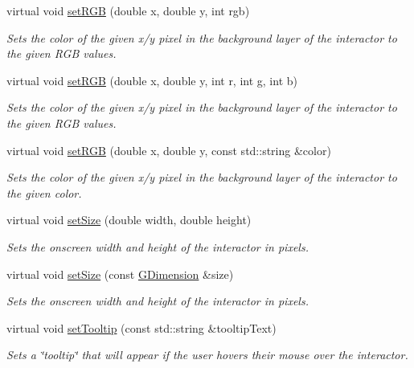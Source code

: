 \begin{DoxyCompactItemize}
virtual void \mbox{\hyperlink{classGDrawingSurface_a8bcbd65fa784bdab1e66a9efd381162d}{set\+R\+GB}} (double x, double y, int rgb)
\begin{DoxyCompactList}\small\item\em Sets the color of the given x/y pixel in the background layer of the interactor to the given R\+GB values. \end{DoxyCompactList}\item 
virtual void \mbox{\hyperlink{classGDrawingSurface_a81202471d4fc9f2015aef0bc073acfab}{set\+R\+GB}} (double x, double y, int r, int g, int b)
\begin{DoxyCompactList}\small\item\em Sets the color of the given x/y pixel in the background layer of the interactor to the given R\+GB values. \end{DoxyCompactList}\item 
virtual void \mbox{\hyperlink{classGDrawingSurface_ae9a228792d4bb4b628350f39eaa3ad12}{set\+R\+GB}} (double x, double y, const std\+::string \&color)
\begin{DoxyCompactList}\small\item\em Sets the color of the given x/y pixel in the background layer of the interactor to the given color. \end{DoxyCompactList}\item 
virtual void \mbox{\hyperlink{classGInteractor_aca25d49481f9bf5fc8f7df4c086c4ce7}{set\+Size}} (double width, double height)
\begin{DoxyCompactList}\small\item\em Sets the onscreen width and height of the interactor in pixels. \end{DoxyCompactList}\item 
virtual void \mbox{\hyperlink{classGInteractor_ae2b628228f192c2702c4ce941b2af68f}{set\+Size}} (const \mbox{\hyperlink{classGDimension}{G\+Dimension}} \&size)
\begin{DoxyCompactList}\small\item\em Sets the onscreen width and height of the interactor in pixels. \end{DoxyCompactList}\item 
virtual void \mbox{\hyperlink{classGInteractor_a039e0e49beaecc275efce02d416acea8}{set\+Tooltip}} (const std\+::string \&tooltip\+Text)
\begin{DoxyCompactList}\small\item\em Sets a \char`\"{}tooltip\char`\"{} that will appear if the user hovers their mouse over the interactor. \end{DoxyCompactList}\item 

\end{DoxyCompactItemize}
